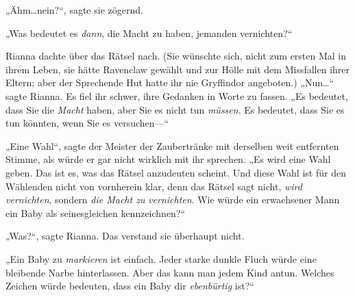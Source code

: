 „Ähm…nein?“, sagte sie zögernd.

„Was bedeutet es \emph{dann}, die Macht zu haben, jemanden vernichten?“

Rianna dachte über das Rätsel nach. (Sie wünschte sich, nicht zum ersten Mal in ihrem Leben, sie hätte Ravenclaw gewählt und zur Hölle mit dem Missfallen ihrer Eltern; aber der Sprechende Hut hatte ihr nie Gryffindor angeboten.) „Nun…“ sagte Rianna. Es fiel ihr schwer, ihre Gedanken in Worte zu fassen. „Es bedeutet, dass Sie die \emph{Macht} haben, aber Sie es nicht tun \emph{müssen}. Es bedeutet, dass Sie es tun könnten, wenn Sie es versuchen—“

„Eine Wahl“, sagte der Meister der Zaubertränke mit derselben weit entfernten Stimme, als würde er gar nicht wirklich mit ihr sprechen. „Es wird eine Wahl geben. Das ist es, was das Rätsel anzudeuten scheint. Und diese Wahl ist für den Wählenden nicht von vornherein klar, denn das Rätsel sagt nicht, \emph{wird} \emph{vernichten}, sondern \emph{die Macht zu} \emph{vernichten}. Wie würde ein erwachsener Mann ein Baby als seinesgleichen kennzeichnen?“

„Was?“, sagte Rianna. Das verstand sie überhaupt nicht.

„Ein Baby zu \emph{markieren} ist einfach. Jeder starke dunkle Fluch würde eine bleibende Narbe hinterlassen. Aber das kann man jedem Kind antun. Welches Zeichen würde bedeuten, dass ein Baby dir \emph{ebenbürtig} ist?“

